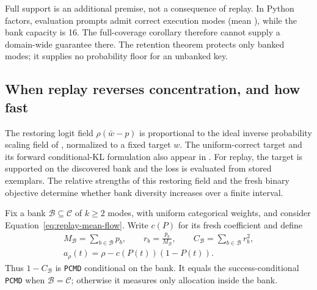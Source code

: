 \documentclass{article}
\newcommand{\1}{\mathbf 1}
\newcommand{\pmd}{\texttt{PCMD}}
\theoremstyle{remark}
\theoremstyle{definition}
\theoremstyle{plain}
\begin{document}
Full support is an additional premise, not a consequence of replay. In
Python factors, evaluation prompts admit \MDvmPythonRange{} correct execution
modes (mean \MDvmPythonMean{}), while the bank capacity is 16. The
full-coverage corollary therefore cannot supply a domain-wide guarantee there. The retention theorem protects only
banked modes; it supplies no probability floor for an unbanked key.

\subsection{When replay reverses concentration, and how fast}
\label{app:theory-replay-finite-horizon}

The restoring logit field $\rho(\bar w-p)$ is proportional to the ideal
inverse probability scaling field of
\citet[Theorem~4.1, v1]{sinha2026expected}, normalized to a fixed target $w$.
The uniform-correct target and its forward conditional-KL formulation also
appear in \citet[Sections~5.2 and~6.2, v1]{lochab2026ucpo}. For replay, the target is
supported on the discovered bank and the loss is evaluated from stored
exemplars. The relative strengths of this restoring field and the fresh
binary objective determine whether bank diversity increases over a finite
interval.

Fix a bank $\mathcal B\subseteq\mathcal C$ of $k\ge2$ modes, with uniform
categorical weights, and consider Equation~\eqref{eq:replay-mean-flow}.
Write $c(P)$ for its fresh coefficient and define
\begin{equation}
 \begin{gathered}
 M_{\mathcal B}=\sum_{b\in\mathcal B}p_b,\qquad
 r_b=\frac{p_b}{M_{\mathcal B}},\qquad
 C_{\mathcal B}=\sum_{b\in\mathcal B}r_b^2,\\
 a_\rho(t)=\rho-c(P(t))(1-P(t)).
 \end{gathered}
 \label{eq:replay-finite-notation}
\end{equation}
Thus $1-C_{\mathcal B}$ is \pmd{} conditional on the bank. It equals the
success-conditional \pmd{} when $\mathcal B=\mathcal C$; otherwise
it measures only allocation inside the bank.
\end{document}
